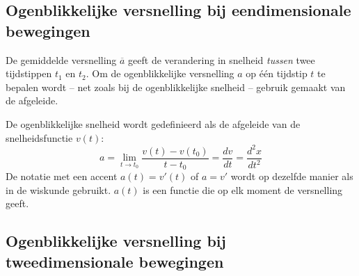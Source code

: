 \documentclass{ximera}
\begin{document}
\subsection*{Ogenblikkelijke versnelling bij eendimensionale bewegingen}

De gemiddelde versnelling \(\overline{a}\) geeft de verandering in snelheid \textit{tussen} twee tijdstippen \(t_1\) en \(t_2\).  Om de ogenblikkelijke versnelling \(a\) op één tijdstip \(t\) te bepalen wordt -- net zoals bij de ogenblikkelijke snelheid -- gebruik gemaakt van de afgeleide.

\begin{definition}
	De ogenblikkelijke snelheid wordt gedefinieerd als de afgeleide van de snelheidsfunctie \(v(t)\):
	\[
		a=\lim_{t\to t_0}\frac{v(t)-v(t_0)}{t-t_0} = \frac{dv}{dt}=\frac{d^2x}{dt^2}
		\]
		De notatie met een accent $a(t)=v'(t)$ of $a=v'$ wordt op dezelfde manier als in de wiskunde gebruikt. $a(t)$ is een functie die op elk moment de versnelling geeft. 
	\end{definition}
	
	

\subsection*{Ogenblikkelijke versnelling bij tweedimensionale bewegingen}
	
	


\end{document}
